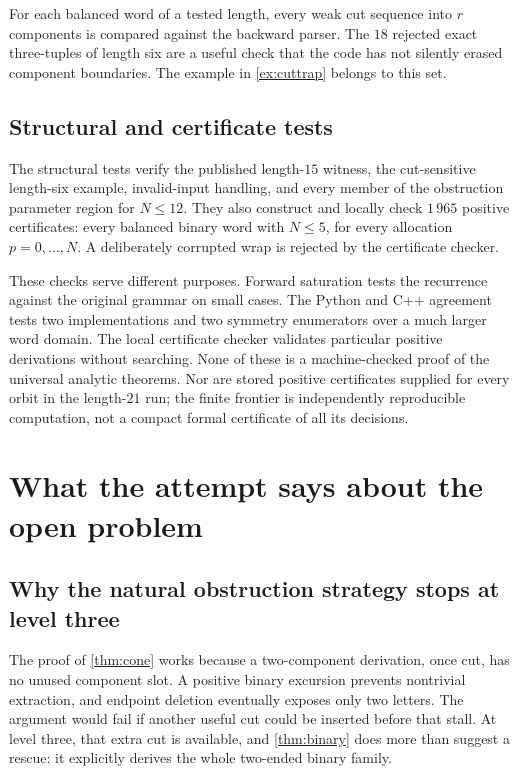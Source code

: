 \documentclass[11pt,letterpaper]{article}
\numberwithin{equation}{section}
\theoremstyle{definition}
\theoremstyle{remark}
\begin{document}
For each balanced word of a tested length, every weak cut sequence into
\(r\) components is compared against the backward parser. The
\(18\) rejected exact three-tuples of length six are a useful check
that the code has not silently erased component boundaries. The
example in \cref{ex:cuttrap} belongs to this set.

\subsection{Structural and certificate tests}
The structural tests verify the published length-\(15\) witness, the
cut-sensitive length-six example, invalid-input handling, and every
member of the obstruction parameter region for \(N\leq12\). They also
construct and locally check \(1\,965\) positive certificates: every
balanced binary word with \(N\leq5\), for every allocation
\(p=0,\ldots,N\). A deliberately corrupted wrap is rejected by the
certificate checker.

These checks serve different purposes. Forward saturation tests the
recurrence against the original grammar on small cases. The Python
and C++ agreement tests two implementations and two symmetry
enumerators over a much larger word domain. The local certificate
checker validates particular positive derivations without searching.
None of these is a machine-checked proof of the universal analytic
theorems. Nor are stored positive certificates supplied for every
orbit in the length-\(21\) run; the finite frontier is independently
reproducible computation, not a compact formal certificate of all
its decisions.

\section{What the attempt says about the open problem}
\label{sec:remaining}

\subsection{Why the natural obstruction strategy stops at level three}
The proof of \cref{thm:cone} works because a two-component derivation,
once cut, has no unused component slot. A positive binary excursion
prevents nontrivial extraction, and endpoint deletion eventually
exposes only two letters. The argument would fail if another useful
cut could be inserted before that stall. At level three, that extra
cut is available, and \cref{thm:binary} does more than suggest a
rescue: it explicitly derives the whole two-ended binary family.
\end{document}
